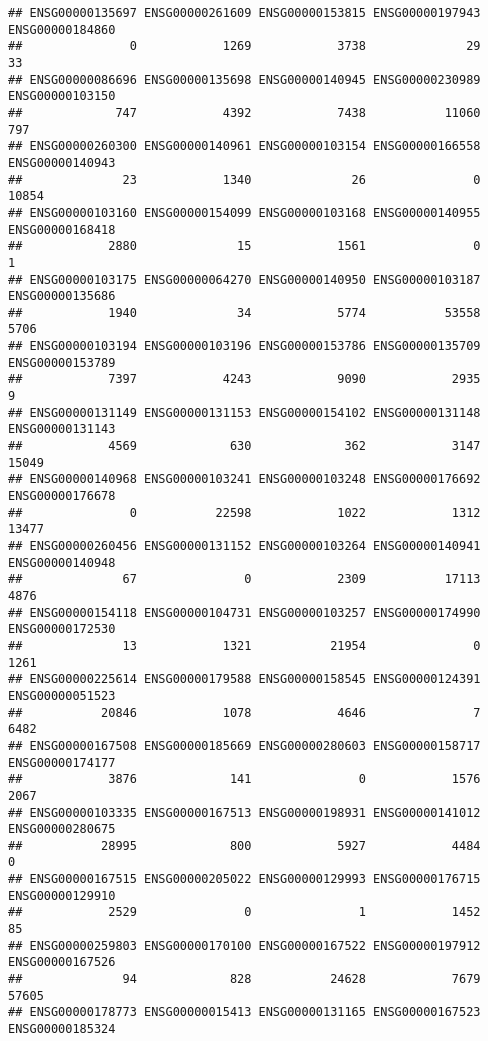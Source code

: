 \documentclass[
]{article}
\begin{document}
\begin{verbatim}
## ENSG00000135697 ENSG00000261609 ENSG00000153815 ENSG00000197943 ENSG00000184860 
##               0            1269            3738              29              33 
## ENSG00000086696 ENSG00000135698 ENSG00000140945 ENSG00000230989 ENSG00000103150 
##             747            4392            7438           11060             797 
## ENSG00000260300 ENSG00000140961 ENSG00000103154 ENSG00000166558 ENSG00000140943 
##              23            1340              26               0           10854 
## ENSG00000103160 ENSG00000154099 ENSG00000103168 ENSG00000140955 ENSG00000168418 
##            2880              15            1561               0               1 
## ENSG00000103175 ENSG00000064270 ENSG00000140950 ENSG00000103187 ENSG00000135686 
##            1940              34            5774           53558            5706 
## ENSG00000103194 ENSG00000103196 ENSG00000153786 ENSG00000135709 ENSG00000153789 
##            7397            4243            9090            2935               9 
## ENSG00000131149 ENSG00000131153 ENSG00000154102 ENSG00000131148 ENSG00000131143 
##            4569             630             362            3147           15049 
## ENSG00000140968 ENSG00000103241 ENSG00000103248 ENSG00000176692 ENSG00000176678 
##               0           22598            1022            1312           13477 
## ENSG00000260456 ENSG00000131152 ENSG00000103264 ENSG00000140941 ENSG00000140948 
##              67               0            2309           17113            4876 
## ENSG00000154118 ENSG00000104731 ENSG00000103257 ENSG00000174990 ENSG00000172530 
##              13            1321           21954               0            1261 
## ENSG00000225614 ENSG00000179588 ENSG00000158545 ENSG00000124391 ENSG00000051523 
##           20846            1078            4646               7            6482 
## ENSG00000167508 ENSG00000185669 ENSG00000280603 ENSG00000158717 ENSG00000174177 
##            3876             141               0            1576            2067 
## ENSG00000103335 ENSG00000167513 ENSG00000198931 ENSG00000141012 ENSG00000280675 
##           28995             800            5927            4484               0 
## ENSG00000167515 ENSG00000205022 ENSG00000129993 ENSG00000176715 ENSG00000129910 
##            2529               0               1            1452              85 
## ENSG00000259803 ENSG00000170100 ENSG00000167522 ENSG00000197912 ENSG00000167526 
##              94             828           24628            7679           57605 
## ENSG00000178773 ENSG00000015413 ENSG00000131165 ENSG00000167523 ENSG00000185324 

\end{verbatim}
\end{document}
